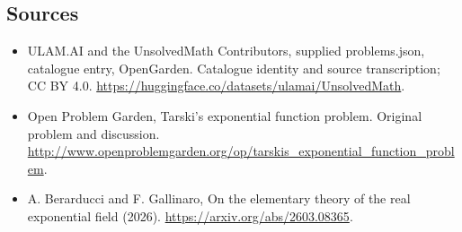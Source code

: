 \documentclass[11pt,a4paper]{article}
\begin{document}
\subsection{Sources}
\begin{itemize}
\item[S1] ULAM.AI and the UnsolvedMath Contributors, supplied problems.json, catalogue entry, OpenGarden. Catalogue identity and source transcription; CC BY 4.0.
\url{https://huggingface.co/datasets/ulamai/UnsolvedMath}.
\item[S2] Open Problem Garden, Tarski's exponential function problem. Original problem and discussion.
\url{http://www.openproblemgarden.org/op/tarskis_exponential_function_problem}.
\item[S3] A. Berarducci and F. Gallinaro, On the elementary theory of the real exponential field (2026).
\url{https://arxiv.org/abs/2603.08365}.
\end{itemize}
\end{document}
